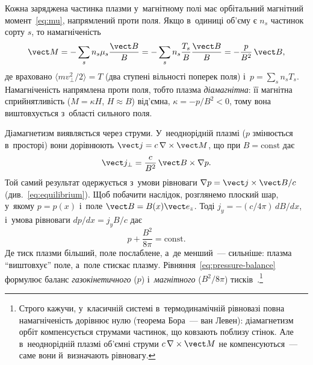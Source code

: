 Кожна заряджена частинка плазми у~магнітному полі має орбітальний магнітний
момент~\eqref{eq:mu}, напрямлений проти поля. Якщо в~одиниці об'єму є $n_s$ частинок сорту
$s$, то намагніченість
\begin{equation*}
	\vect M=-\sum_sn_s\mu_s\frac{\vect B}{B}=-\sum_sn_s\frac{T_s}{B}\frac{\vect B}{B}=-\frac p{B^2}\,\vect B,
\end{equation*}
де враховано $\langle mv_\perp^2/2\rangle=T$ (два ступені вільності поперек
поля) і~$p=\sum_sn_sT_s$. Намагніченість напрямлена проти поля, тобто
плазма \emph{діамагнітна}: її магнітна сприйнятливість
($M=\kappa H$, $H\approx B$) від'ємна, $\kappa=-p/B^2<0$, тому вона виштовхується з~області
сильного поля.

Діамагнетизм виявляється через струми. У~неоднорідній плазмі ($p$ змінюється в~просторі)
вони дорівнюють $\vect j=c\,\nabla\times\vect M$, що при $B=\mathrm{const}$ дає
\begin{equation}\label{eq:diamagnetic-current}
	\vect j_\perp=\frac{c}{B^2}\,\vect B\times\nabla p.
\end{equation}
Той самий результат одержується з~умови рівноваги $\nabla p=\vect j\times\vect B/c$
(див.~\eqref{eq:equilibrium}). Щоб побачити наслідок, розглянемо плоский шар, у~якому $p=p(x)$ і~поле
$\vect B=B(x)\vect e_z$. Тоді $j_y=-(c/4\pi)\,dB/dx$, і~умова рівноваги $dp/dx=j_yB/c$ дає
\begin{equation}\label{eq:pressure-balance}
	p+\frac{B^2}{8\pi}=\mathrm{const}.
\end{equation}
Де тиск плазми більший, поле послаблене, а~де менший~--- сильніше: плазма \enquote{виштовхує} поле,
а~поле стискає плазму. Рівняння~\eqref{eq:pressure-balance} формулює баланс
\emph{газокінетичного} ($p$) і~\emph{магнітного} ($B^2/8\pi$) тисків~\cite{chen2016introduction}.\footnote{Строго
кажучи, у~класичній системі в~термодинамічній рівновазі повна намагніченість дорівнює нулю
(теорема Бора~--- ван Левен): діамагнетизм орбіт компенсується струмами частинок, що
ковзають поблизу стінок. Але в~неоднорідній плазмі об'ємні струми $c\,\nabla\times\vect M$
не компенсуються~--- саме вони й~визначають рівновагу.}


